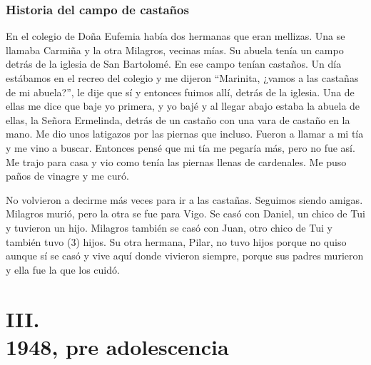 \documentclass[12pt,a5paper]{book}
\begin{document}
\subsubsection*{Historia del campo de castaños}

En el colegio de Doña Eufemia había dos hermanas que eran mellizas. Una se llamaba Carmiña y la otra Milagros, vecinas mías. Su abuela tenía un campo detrás de la iglesia de San Bartolomé. En ese campo tenían castaños. Un día estábamos en el recreo del colegio y me dijeron “Marinita, ¿vamos a las castañas de mi abuela?”, le dije que sí y entonces fuimos allí, detrás de la iglesia. Una de ellas me dice que baje yo primera, y yo bajé y al llegar abajo estaba la abuela de ellas, la Señora Ermelinda, detrás de un castaño con una vara de castaño en la mano. Me dio unos latigazos por las piernas que incluso. Fueron a llamar a mi tía y me vino a buscar. Entonces pensé que mi tía me pegaría más, pero no fue así. Me trajo para casa y vio como tenía las piernas llenas de cardenales. Me puso paños de vinagre y me curó.

No volvieron a decirme más veces para ir a las castañas. Seguimos siendo amigas. Milagros murió, pero la otra se fue para Vigo. Se casó con Daniel, un chico de Tui y tuvieron un hijo. Milagros también se casó con Juan, otro chico de Tui y también tuvo (3) hijos. Su otra hermana, Pilar, no tuvo hijos porque no quiso aunque sí se casó y vive aquí donde vivieron siempre, porque sus padres murieron y ella fue la que los cuidó.



\section*{III.\\1948, pre adolescencia}
\end{document}

